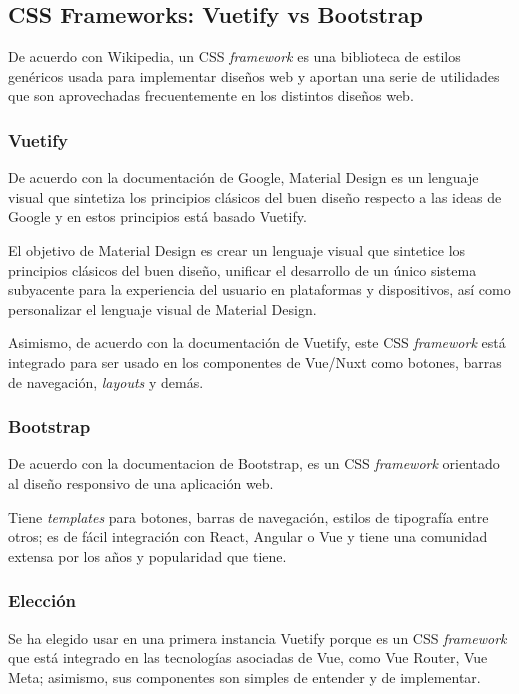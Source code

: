 \subsection{CSS Frameworks: Vuetify vs Bootstrap}
De acuerdo con Wikipedia\cite{wikipedia_contributors_css_2020}, un CSS \textit{framework} es una biblioteca de estilos genéricos usada para implementar diseños web y aportan una serie de utilidades que son aprovechadas frecuentemente en los distintos diseños web.

\subsubsection*{Vuetify}
De acuerdo con la documentación de Google\cite{noauthor_introduction_nodate}, Material Design es un lenguaje visual que sintetiza los principios clásicos del buen diseño respecto a las ideas de Google y en estos principios está basado Vuetify.


El objetivo de Material Design es crear un lenguaje visual que sintetice los principios clásicos del buen diseño, unificar el desarrollo de un único sistema subyacente para la experiencia del usuario en plataformas y dispositivos, así como personalizar el lenguaje visual de Material Design.


Asimismo, de acuerdo con la documentación de Vuetify\cite{noauthor_vuetify_nodate}, este CSS \textit{framework} está integrado para ser usado en los componentes de Vue/Nuxt como botones, barras de navegación, \textit{layouts} y demás.

\subsubsection*{Bootstrap}
De acuerdo con la documentacion de Bootstrap\cite{noauthor_documentation_nodate-1}, es un CSS \textit{framework} orientado al diseño responsivo de una aplicación web. 


Tiene \textit{templates} para botones, barras de navegación, estilos de tipografía entre otros; es de fácil integración con React, Angular o Vue y tiene una comunidad extensa por los años y popularidad que tiene.

\subsubsection*{Elección}

Se ha elegido usar en una primera instancia Vuetify porque es un CSS \textit{framework} que está integrado en las tecnologías asociadas de Vue, como Vue Router, Vue Meta; asimismo, sus componentes son simples de entender y de implementar.
